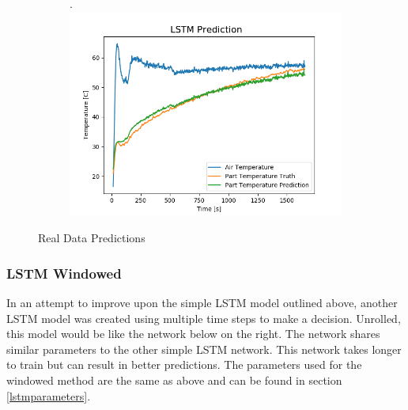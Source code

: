 \begin{figure}[ht]
\begin{subfigure}{.34\linewidth}
    \end{subfigure}
    \begin{subfigure}{.34\linewidth}.
        \centering
    	\includegraphics[width=\linewidth]{lstm/perf3.png}
    \end{subfigure}
    \caption{Real Data Predictions}
    \label{fig:real_data_perf_lstm}
\end{figure}
\newpage
\subsubsection{LSTM Windowed}
In an attempt to improve upon the simple LSTM model outlined above, another LSTM model was created using multiple time steps to make a decision. Unrolled, this model would be like the network below on the right. The network shares similar parameters to the other simple LSTM network. This network takes longer to train but can result in better predictions. The parameters used for the windowed method are the same as above and can be found in section \ref{lstmparameters}. 
